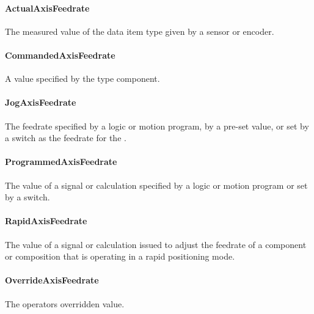 \paragraph{ActualAxisFeedrate}\mbox{}
\label{sec:ActualAxisFeedrate}



The measured value of the data item type given by a sensor or encoder.


\paragraph{CommandedAxisFeedrate}\mbox{}
\label{sec:CommandedAxisFeedrate}



A value specified by the  type component.


\paragraph{JogAxisFeedrate}\mbox{}
\label{sec:JogAxisFeedrate}



The feedrate specified by a logic or motion program, by a pre-set value, or set by a switch as the feedrate for the . 


\paragraph{ProgrammedAxisFeedrate}\mbox{}
\label{sec:ProgrammedAxisFeedrate}



The value of a signal or calculation specified by a logic or motion program or set by a switch.


\paragraph{RapidAxisFeedrate}\mbox{}
\label{sec:RapidAxisFeedrate}



The value of a signal or calculation issued to adjust the feedrate of a component or composition that is operating in a rapid positioning mode.


\paragraph{OverrideAxisFeedrate}\mbox{}
\label{sec:OverrideAxisFeedrate}



The operators overridden value.


